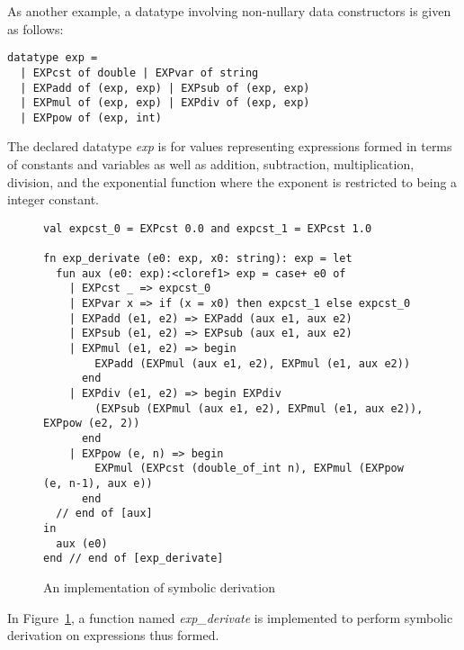 As another example, a datatype involving non-nullary data constructors is
given as follows:
\begin{verbatim}
datatype exp =
  | EXPcst of double | EXPvar of string
  | EXPadd of (exp, exp) | EXPsub of (exp, exp)
  | EXPmul of (exp, exp) | EXPdiv of (exp, exp)
  | EXPpow of (exp, int)
\end{verbatim}
The declared datatype {\it exp} is for values representing expressions
formed in terms of constants and variables as well as addition,
subtraction, multiplication, division, and the exponential function where
the exponent is restricted to being a integer constant.
\begin{figure}[thp]
\begin{verbatim}
val expcst_0 = EXPcst 0.0 and expcst_1 = EXPcst 1.0

fn exp_derivate (e0: exp, x0: string): exp = let
  fun aux (e0: exp):<cloref1> exp = case+ e0 of
    | EXPcst _ => expcst_0
    | EXPvar x => if (x = x0) then expcst_1 else expcst_0
    | EXPadd (e1, e2) => EXPadd (aux e1, aux e2)
    | EXPsub (e1, e2) => EXPsub (aux e1, aux e2)
    | EXPmul (e1, e2) => begin
        EXPadd (EXPmul (aux e1, e2), EXPmul (e1, aux e2))
      end
    | EXPdiv (e1, e2) => begin EXPdiv
        (EXPsub (EXPmul (aux e1, e2), EXPmul (e1, aux e2)), EXPpow (e2, 2))
      end
    | EXPpow (e, n) => begin
        EXPmul (EXPcst (double_of_int n), EXPmul (EXPpow (e, n-1), aux e))
      end
  // end of [aux]
in
  aux (e0)
end // end of [exp_derivate]
\end{verbatim}
\caption{An implementation of symbolic derivation}
\label{figure:symbolic_derivation}
\end{figure}
In Figure~\ref{figure:symbolic_derivation}, a function named
{\it exp\_derivate} is implemented to perform symbolic derivation
on expressions thus formed.

